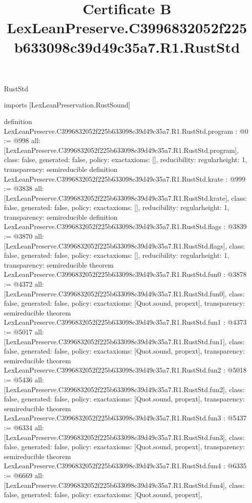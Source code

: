 \begin{lexlean}{RustStd}
\title{Certificate B LexLeanPreserve.C3996832052f225b633098c39d49c35a7.R1.RustStd}
\begin{coremodule}
imports [LexLeanPreservation.RustSound]

definition LexLeanPreserve.C3996832052f225b633098c39d49c35a7.R1.RustStd.program : @0 := @998 {
  all: [LexLeanPreserve.C3996832052f225b633098c39d49c35a7.R1.RustStd.program],
  class: false,
  generated: false,
  policy: exact{axioms: []},
  reducibility: regular{height: 1},
  transparency: semireducible
}
definition LexLeanPreserve.C3996832052f225b633098c39d49c35a7.R1.RustStd.krate : @999 := @3838 {
  all: [LexLeanPreserve.C3996832052f225b633098c39d49c35a7.R1.RustStd.krate],
  class: false,
  generated: false,
  policy: exact{axioms: []},
  reducibility: regular{height: 1},
  transparency: semireducible
}
definition LexLeanPreserve.C3996832052f225b633098c39d49c35a7.R1.RustStd.flags : @3839 := @3870 {
  all: [LexLeanPreserve.C3996832052f225b633098c39d49c35a7.R1.RustStd.flags],
  class: false,
  generated: false,
  policy: exact{axioms: []},
  reducibility: regular{height: 1},
  transparency: semireducible
}
theorem LexLeanPreserve.C3996832052f225b633098c39d49c35a7.R1.RustStd.fun0 : @3878 := @4372 {
  all: [LexLeanPreserve.C3996832052f225b633098c39d49c35a7.R1.RustStd.fun0],
  class: false,
  generated: false,
  policy: exact{axioms: [Quot.sound, propext]},
  transparency: semireducible
}
theorem LexLeanPreserve.C3996832052f225b633098c39d49c35a7.R1.RustStd.fun1 : @4373 := @5017 {
  all: [LexLeanPreserve.C3996832052f225b633098c39d49c35a7.R1.RustStd.fun1],
  class: false,
  generated: false,
  policy: exact{axioms: [Quot.sound, propext]},
  transparency: semireducible
}
theorem LexLeanPreserve.C3996832052f225b633098c39d49c35a7.R1.RustStd.fun2 : @5018 := @5436 {
  all: [LexLeanPreserve.C3996832052f225b633098c39d49c35a7.R1.RustStd.fun2],
  class: false,
  generated: false,
  policy: exact{axioms: [Quot.sound, propext]},
  transparency: semireducible
}
theorem LexLeanPreserve.C3996832052f225b633098c39d49c35a7.R1.RustStd.fun3 : @5437 := @6334 {
  all: [LexLeanPreserve.C3996832052f225b633098c39d49c35a7.R1.RustStd.fun3],
  class: false,
  generated: false,
  policy: exact{axioms: [Quot.sound, propext]},
  transparency: semireducible
}
theorem LexLeanPreserve.C3996832052f225b633098c39d49c35a7.R1.RustStd.fun4 : @6335 := @6669 {
  all: [LexLeanPreserve.C3996832052f225b633098c39d49c35a7.R1.RustStd.fun4],
  class: false,
  generated: false,
  policy: exact{axioms: [Quot.sound, propext]},
}
\end{coremodule}
\end{lexlean}
